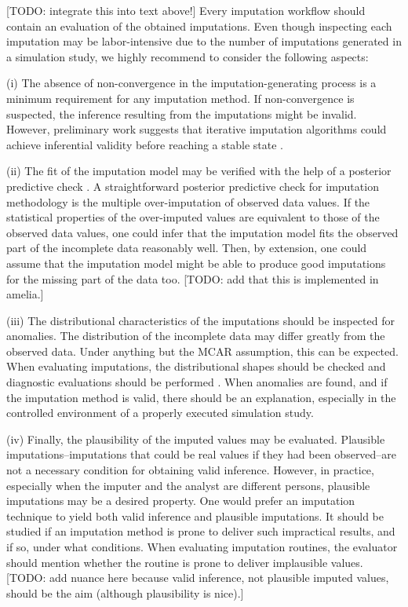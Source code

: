 \documentclass[bimj,fleqn]{w-art}
\begin{document}
[TODO: integrate this into text above!] Every imputation workflow should contain an evaluation of the obtained imputations. Even though inspecting each imputation may be labor-intensive due to the number of imputations generated in a simulation study, we highly recommend to consider the following aspects:

(i) The absence of non-convergence in the imputation-generating process is a minimum requirement for any imputation method. If non-convergence is suspected, the inference resulting from the imputations might be invalid. However, preliminary work suggests that iterative imputation algorithms could achieve inferential validity before reaching a stable state \citep{ober21}. 

(ii) The fit of the imputation model may be verified with the help of a posterior predictive check \citep[][]{nguy17, zhao22}. A straightforward posterior predictive check for imputation methodology is the multiple over-imputation of observed data values. If the statistical properties of the over-imputed values are equivalent to those of the observed data values, one could infer that the imputation model fits the observed part of the incomplete data reasonably well. Then, by extension, one could assume that the imputation model might be able to produce good imputations for the missing part of the data too. [TODO: add that this is implemented in amelia.]

(iii) The distributional characteristics of the imputations should be inspected for anomalies. The distribution of the incomplete data may differ greatly from the observed data. Under anything but the MCAR assumption, this can be expected. When evaluating imputations, the distributional shapes should be checked and diagnostic evaluations should be performed \citep[see][for a detailed overview of diagnostic evaluation for multivariate imputations]{abayomi2008diagnostics}. When anomalies are found, and if the imputation method is valid, there should be an explanation, especially in the controlled environment of a properly executed simulation study. 

(iv) Finally, the plausibility of the imputed values may be evaluated. Plausible imputations--imputations that could be real values if they had been observed--are not a necessary condition for obtaining valid inference. However, in practice, especially when the imputer and the analyst are different persons, plausible imputations may be a desired property. One would prefer an imputation technique to yield both valid inference and plausible imputations. It should be studied if an imputation method is prone to deliver such impractical results, and if so, under what conditions. When evaluating imputation routines, the evaluator should mention whether the routine is prone to deliver implausible values. [TODO: add nuance here because valid inference, not plausible imputed values, should be the aim (although plausibility is nice).]
\end{document}

